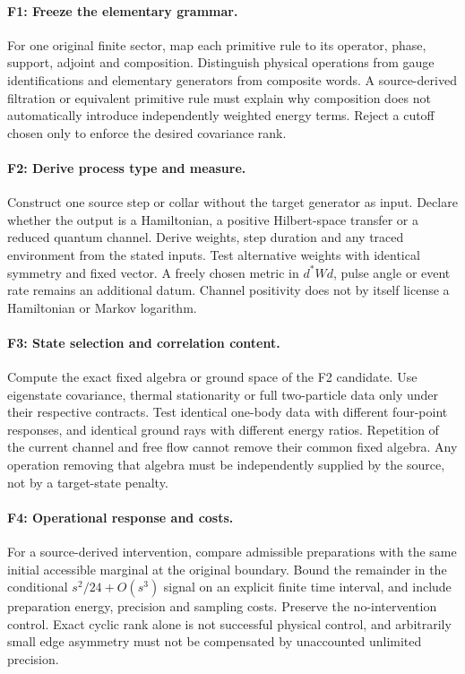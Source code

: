 \paragraph{F1: Freeze the elementary grammar.}
For one original finite sector, map each primitive rule to its operator,
phase, support, adjoint and composition. Distinguish physical operations
from gauge identifications and elementary generators from composite words.
A source-derived filtration or equivalent primitive rule must explain why
composition does not automatically introduce independently weighted energy
terms. Reject a cutoff chosen only to enforce the desired covariance rank.

\paragraph{F2: Derive process type and measure.}
Construct one source step or collar without the target generator as input.
Declare whether the output is a Hamiltonian, a positive Hilbert-space
transfer or a reduced quantum channel. Derive weights, step duration and
any traced environment from the stated inputs. Test alternative weights
with identical symmetry and fixed vector. A freely chosen metric in
$d^*Wd$, pulse angle or event rate remains an additional datum. Channel
positivity does not by itself license a Hamiltonian or Markov logarithm.

\paragraph{F3: State selection and correlation content.}
Compute the exact fixed algebra or ground space of the F2 candidate.
Use eigenstate covariance, thermal stationarity or full two-particle data
only under their respective contracts. Test identical one-body data with
different four-point responses, and identical ground rays with different
energy ratios. Repetition of the current channel and free flow cannot
remove their common fixed algebra. Any operation removing that algebra
must be independently supplied by the source, not by a target-state penalty.

\paragraph{F4: Operational response and costs.}
For a source-derived intervention, compare admissible preparations with
the same initial accessible marginal at the original boundary. Bound the
remainder in the conditional $s^2/24+O(s^3)$ signal on an explicit finite
time interval, and include preparation energy, precision and sampling
costs. Preserve the no-intervention control. Exact cyclic rank alone is
not successful physical control, and arbitrarily small edge asymmetry
must not be compensated by unaccounted unlimited precision.

